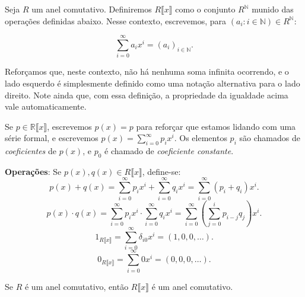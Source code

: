 \begin{definition}
Seja $R$ um anel comutativo.
Definiremos $R\llbracket x\rrbracket$ como o conjunto $R^{\mathbb N}$ munido das operações definidas abaixo.
Nesse contexto, escrevemos, para $(a_i: i \in \mathbb N)\in R^{\mathbb N}$:

\[\sum_{i=0}^\infty a_ix^i=(a_i)_{i \in \mathbb N}.\]

Reforçamos que, neste contexto, não há nenhuma soma infinita ocorrendo, e o lado esquerdo é simplesmente definido como uma notação alternativa para o lado direito.
Note ainda que, com essa definição, a propriedade da igualdade acima vale automaticamente.

Se $p\in \mathbb R\llbracket x\rrbracket$, escrevemos $p(x)=p$ para reforçar que estamos lidando com uma série formal, e escrevemos $p(x)=\sum_{i=0}^\infty p_ix^i$. Os elementos $p_i$ são chamados de \emph{coeficientes} de $p(x)$, e $p_0$ é chamado de \emph{coeficiente constante}.

\textbf{Operações}:
Se $p(x), q(x) \in R\llbracket x\rrbracket$, define-se:
\[p(x)+q(x)=\sum_{i=0}^\infty p_ix^i+\sum_{i=0}^\infty q_ix^i=\sum_{i=0}^\infty(p_i+q_i)x^i.\]
\[p(x)\cdot q(x)=\sum_{i=0}^\infty p_ix^i\cdot\sum_{i=0}^\infty q_ix^i=\sum_{i=0}^\infty\left(\sum_{j=0}^i p_{i-j}q_{j}\right)x^i.\]
\[1_{R\llbracket x\rrbracket}=\sum_{i=0}^\infty \delta_{i0}x^i=(1, 0, 0, \dots).\]
\[0_{R\llbracket x\rrbracket}=\sum_{i=0}^\infty 0x^i=(0, 0, 0, \dots).\]
\end{definition}

\begin{lemma}
    Se $R$ é um anel comutativo, então $R\llbracket x \rrbracket$ é um anel comutativo.
\end{lemma}


